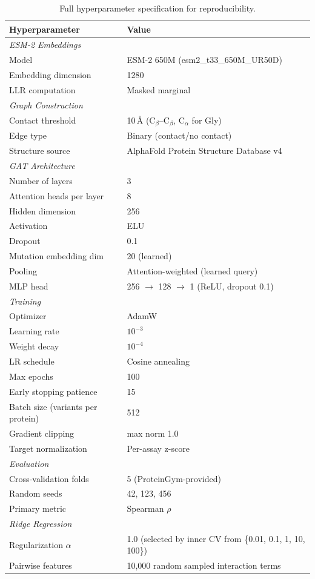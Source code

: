 \documentclass{article}
\begin{document}
\begin{table}[h]
\caption{Full hyperparameter specification for reproducibility.}
\centering
\small
\begin{tabular}{ll}
\toprule
Hyperparameter & Value \\
\midrule
\multicolumn{2}{l}{\emph{ESM-2 Embeddings}} \\
Model & ESM-2 650M (esm2\_t33\_650M\_UR50D) \\
Embedding dimension & 1280 \\
LLR computation & Masked marginal \\
\midrule
\multicolumn{2}{l}{\emph{Graph Construction}} \\
Contact threshold & 10\,\AA{} (C$_\beta$--C$_\beta$, C$_\alpha$ for Gly) \\
Edge type & Binary (contact/no contact) \\
Structure source & AlphaFold Protein Structure Database v4 \\
\midrule
\multicolumn{2}{l}{\emph{GAT Architecture}} \\
Number of layers & 3 \\
Attention heads per layer & 8 \\
Hidden dimension & 256 \\
Activation & ELU \\
Dropout & 0.1 \\
Mutation embedding dim & 20 (learned) \\
Pooling & Attention-weighted (learned query) \\
MLP head & 256 $\to$ 128 $\to$ 1 (ReLU, dropout 0.1) \\
\midrule
\multicolumn{2}{l}{\emph{Training}} \\
Optimizer & AdamW \\
Learning rate & $10^{-3}$ \\
Weight decay & $10^{-4}$ \\
LR schedule & Cosine annealing \\
Max epochs & 100 \\
Early stopping patience & 15 \\
Batch size (variants per protein) & 512 \\
Gradient clipping & max norm 1.0 \\
Target normalization & Per-assay z-score \\
\midrule
\multicolumn{2}{l}{\emph{Evaluation}} \\
Cross-validation folds & 5 (ProteinGym-provided) \\
Random seeds & 42, 123, 456 \\
Primary metric & Spearman $\rho$ \\
\midrule
\multicolumn{2}{l}{\emph{Ridge Regression}} \\
Regularization $\alpha$ & 1.0 (selected by inner CV from \{0.01, 0.1, 1, 10, 100\}) \\
Pairwise features & 10{,}000 random sampled interaction terms \\
\bottomrule
\end{tabular}
\end{table}
\end{document}

